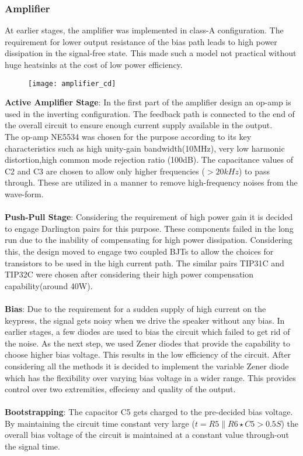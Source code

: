 \subsubsection{Amplifier}
At earlier stages, the amplifier was implemented in class-A configuration. The requirement for lower output resistance of the bias path leads to high power dissipation in the signal-free state. This made such a model not practical without huge heatsinks at the cost of low power efficiency.
\begin{figure}[h]
    \begin{center}
        \texttt{[image: amplifier\_cd]}
    \end{center}
\end{figure}
\textbf{Active Amplifier Stage}: In the first part of the amplifier design an op-amp is used in the inverting configuration. The feedback path is connected to the end of the overall circuit to ensure enough current supply available in the output.\\
The op-amp NE5534 was chosen for the purpose according to its key characteristics such as high unity-gain bandwidth(10MHz), very low harmonic distortion,high common mode rejection ratio (100dB). The capacitance values of C2 and C3 are chosen to allow only higher frequencies ($>20kHz$) to pass through. These are utilized in a manner to remove high-frequency noises from the wave-form.
\\
\\
\textbf{Push-Pull Stage}: Considering the requirement of high power gain it is decided to engage Darlington pairs for this purpose. These components failed in the long run due to the inability of compensating for high power dissipation. Considering this, the design moved to engage two coupled BJTs to allow the choices for transistors to be used in the high current path. The similar pairs TIP31C and TIP32C were chosen after considering their high power compensation capability(around 40W).
\\
\\
\textbf{Bias}: Due to the requirement for a sudden supply of high current on the keypress, the signal gets noisy when we drive the speaker without any bias. In earlier stages, a few diodes are used to bias the circuit which failed to get rid of the noise. As the next step, we used Zener diodes that provide the capability to choose higher bias voltage. This results in the low efficiency of the circuit.
After considering all the methods it is decided to implement the variable Zener diode which has the flexibility over varying bias voltage in a wider range. This provides control over two extremities, effecieny and quality of the output.
\\
\\
\textbf{Bootstrapping}: The capacitor C5 gets charged to the pre-decided bias voltage.  By maintaining the circuit time constant very large ($t=R5\parallel R6\star C5>0.5S$) the overall bias voltage of the circuit is maintained at a constant value through-out the signal time.